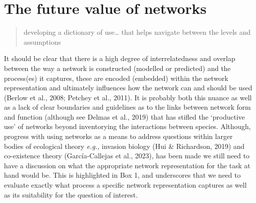 \documentclass[
]{article}
\begin{document}
\section{The future value of
networks}\label{the-future-value-of-networks}

\begin{quote}
developing a dictionary of use\ldots{} that helps navigate between the
levels and assumptions
\end{quote}

It should be clear that there is a high degree of interrelatedness and
overlap between the way a network is constructed (modelled or predicted)
and the process(es) it captures, these are encoded (embedded) within the
network representation and ultimately influences how the network can and
should be used (Berlow et al., 2008; Petchey et al., 2011). It is
probably both this nuance as well as a lack of clear boundaries and
guidelines as to the links between network form and function (although
see Delmas et al., 2019) that has stifled the `productive use' of
networks beyond inventorying the interactions between species. Although,
progress with using networks as a means to address questions within
larger bodies of ecological theory \emph{e.g.,} invasion biology (Hui \&
Richardson, 2019) and co-existence theory (García-Callejas et al.,
2023), has been made we still need to have a discussion on what the
appropriate network representation for the task at hand would be. This
is highlighted in Box 1, and underscores that we need to evaluate
exactly what process a specific network representation captures as well
as its suitability for the question of interest.
\end{document}
